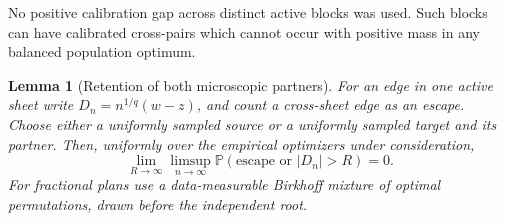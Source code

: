 \documentclass[11pt,reqno]{amsart}
\newtheorem{lemma}[theorem]{Lemma}
\theoremstyle{definition}
\theoremstyle{remark}
\numberwithin{equation}{section}
\newcommand{\Pp}{\mathbb P}
\begin{document}
No positive calibration gap across distinct active blocks was used. Such
blocks can have calibrated cross-pairs which cannot occur with positive
mass in any balanced population optimum.

\begin{lemma}[Retention of both microscopic partners]
\label{general-gluing-partner-retention}
For an edge in one active sheet write \(D_n=n^{1/q}(w-z)\), and count a
cross-sheet edge as an escape. Choose either a uniformly sampled source
or a uniformly sampled target and its partner. Then, uniformly over the
empirical optimizers under consideration,
\begin{equation}
\label{general-gluing-no-escape}
 \lim_{R\to\infty}\limsup_{n\to\infty}
  \Pp(\text{escape or }|D_n|>R)=0.
\end{equation}
For fractional plans use a data-measurable Birkhoff mixture of optimal
permutations, drawn before the independent root.
\end{lemma}
\end{document}
